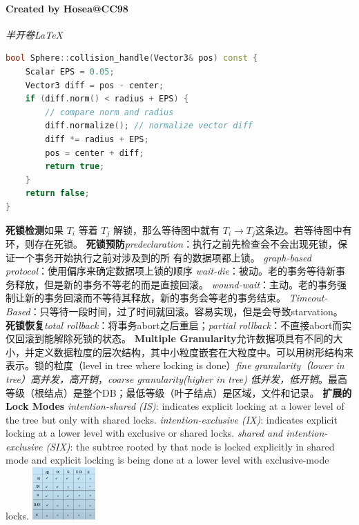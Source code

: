 \documentclass[]{article}
\date{}
\begin{document}
\begin{multicols}{3}

\paragraph{Created by Hosea@CC98}
\emph{半开卷\LaTeX}

\begin{lstlisting}[language=c++]
bool Sphere::collision_handle(Vector3& pos) const {
    Scalar EPS = 0.05;
    Vector3 diff = pos - center;
    if (diff.norm() < radius + EPS) {
        // compare norm and radius
        diff.normalize(); // normalize vector diff
        diff *= radius + EPS;
        pos = center + diff;
        return true;
    }
    return false;
}
\end{lstlisting}


\textbf{死锁检测}如果 $T_i$ 等着 $T_j$ 解锁，那么等待图中就有 $T_i \to T_j$这条边。若等待图中有环，则存在死锁。
\textbf{死锁预防}\textit{predeclaration}：执行之前先检查会不会出现死锁，保证一个事务开始执行之前对涉及到的所
有的数据项都上锁。
\textit{graph-based protocol}：使用偏序来确定数据项上锁的顺序
\textit{wait-die}：被动。老的事务等待新事务释放，但是新的事务不等老的而是直接回滚。
\textit{wound-wait}：主动。老的事务强制让新的事务回滚而不等待其释放，新的事务会等老的事务结束。
\textit{Timeout-Based}：只等待一段时间，过了时间就回滚。容易实现，但是会导致starvation。
\textbf{死锁恢复}\textit{total rollback}：将事务abort之后重启；\textit{partial rollback}：不直接abort而实仅回滚到能解除死锁的状态。
\textbf{Multiple Granularity}允许数据项具有不同的大小，并定义数据粒度的层次结构，其中小粒度嵌套在大粒度中。可以用树形结构来表示。锁的粒度（level in tree where locking is done）\textit{fine granularity（lower in tree）高并发，高开销}，\textit{coarse granularity(higher in tree) 低并发，低开销}。最高等级（根结点）是整个DB；最低等级（叶子结点）是区域，文件和记录。
\textbf{扩展的Lock Modes}
\textit{intention-shared (IS)}: indicates explicit locking at a lower level of the tree but only with shared locks.
\textit{intention-exclusive (IX)}: indicates explicit locking at a lower level with exclusive or shared locks.
\textit{shared and intention-exclusive (SIX)}: the subtree rooted by that node is locked explicitly in shared mode and explicit locking is being done at a lower level with exclusive-mode locks.
\includegraphics[height=20mm]{./img/lock.png}


\end{multicols}
\end{document}
